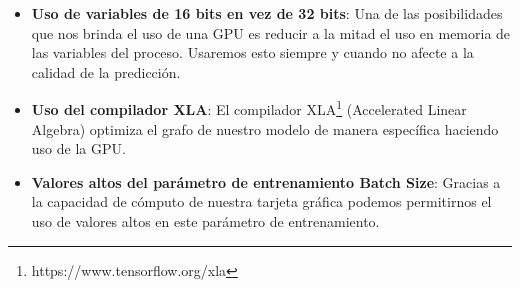 \begin{itemize}
    \item \textbf{Uso de variables de 16 bits en vez de 32 bits}: Una de las posibilidades que nos brinda el uso de una GPU es reducir a la mitad el uso en memoria de las variables del proceso.
    Usaremos esto siempre y cuando no afecte a la calidad de la predicción.
    \item \textbf{Uso del compilador XLA}: El compilador XLA\footnote{https://www.tensorflow.org/xla} (Accelerated Linear Algebra) optimiza el grafo de nuestro modelo de manera específica haciendo uso de la GPU.
    \item \textbf{Valores altos del parámetro de entrenamiento Batch Size}: Gracias a la capacidad de cómputo de nuestra tarjeta gráfica podemos permitirnos el uso de valores altos en este parámetro de entrenamiento.
\end{itemize}


